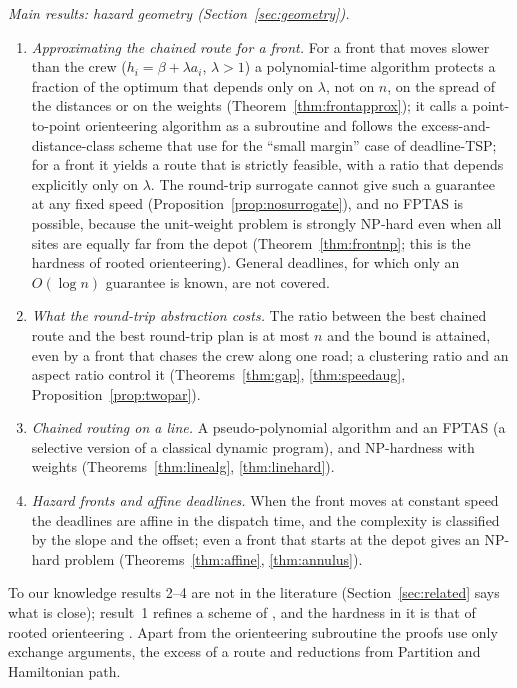 \documentclass[pdflatex,sn-mathphys-ay]{sn-jnl}
\theoremstyle{thmstyleone}
\theoremstyle{thmstyletwo}
\theoremstyle{thmstylethree}
\begin{document}
\emph{Main results: hazard geometry (Section~\ref{sec:geometry}).}
\begin{enumerate}
\item \emph{Approximating the chained route for a front.} For a front that
moves slower than the crew ($h_i=\beta+\lambda a_i$, $\lambda>1$) a
polynomial-time algorithm protects a fraction of the optimum that depends
only on $\lambda$, not on $n$, on the spread of the distances or on the
weights (Theorem~\ref{thm:frontapprox}); it calls a point-to-point
orienteering algorithm as a subroutine and follows the excess-and-distance-class
scheme that \citet{bansal2004} use for the ``small margin'' case of
deadline-TSP; for a front it yields a route that is strictly feasible, with a
ratio that depends explicitly only on $\lambda$. The round-trip surrogate cannot give such a guarantee at any
fixed speed (Proposition~\ref{prop:nosurrogate}), and no FPTAS is possible,
because the unit-weight problem is strongly NP-hard even when all sites are
equally far from the depot (Theorem~\ref{thm:frontnp}; this is the hardness
of rooted orienteering). General deadlines,
for which only an $O(\log n)$ guarantee is known, are not covered.
\item \emph{What the round-trip abstraction costs.} The ratio between the
best chained route and the best round-trip plan is at most $n$ and the bound
is attained, even by a front that chases the crew along one road; a
clustering ratio and an aspect ratio control it
(Theorems~\ref{thm:gap}, \ref{thm:speedaug}, Proposition~\ref{prop:twopar}).
\item \emph{Chained routing on a line.} A pseudo-polynomial algorithm and an
FPTAS (a selective version of a classical dynamic program), and NP-hardness
with weights (Theorems~\ref{thm:linealg}, \ref{thm:linehard}).
\item \emph{Hazard fronts and affine deadlines.} When the front moves at
constant speed the deadlines are affine in the dispatch time, and the
complexity is classified by the slope and the offset; even a front that
starts at the depot gives an NP-hard problem
(Theorems~\ref{thm:affine}, \ref{thm:annulus}).
\end{enumerate}
To our knowledge results 2--4 are not in the literature
(Section~\ref{sec:related} says what is close); result~1 refines a scheme of
\citet{bansal2004}, and the hardness in it is that of rooted orienteering
\citep{golden1987,blum2007}. Apart from the orienteering subroutine the proofs
use only exchange arguments, the excess of a route and reductions from
Partition and Hamiltonian path.
\end{document}
